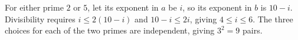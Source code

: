 For either prime $2$ or $5$, let its exponent in $a$ be $i$, so its exponent in $b$ is $10-i$. Divisibility requires $i\le2(10-i)$ and $10-i\le2i$, giving $4\le i\le6$. The three choices for each of the two primes are independent, giving $3^2=\boxed9$ pairs.

